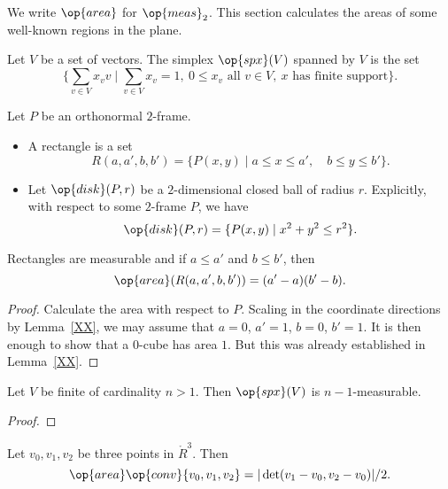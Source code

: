 We write $\op{area}$ for $\op{meas}_2$.  This section calculates the
areas of some well-known regions in the plane.

\begin{definition}  Let $V$ be a set of vectors.  The simplex
$\op{spx}(V)$ spanned by $V$ is the set
    $$\{ \sum_{v\in V} x_v v \mid \sum_{v\in V} x_v = 1,\ 0\le x_v \text{ all } v\in V,
    \ x \text{ has finite support}\}.$$
\end{definition}

\begin{definition}  Let $P$ be an orthonormal $2$-frame.
    \begin{itemize}
    \item A rectangle is a set
    $$R(a,a',b,b') = \{ P(x,y) \mid a \le x \le a',\quad b\le y\le b'\}.$$
    \item Let $\op{disk}(P,r)$
be a $2$-dimensional closed ball of radius $r$.  Explicitly, with
respect to some $2$-frame $P$, we have
    $$
    \op{disk}(P,r) = \{P(x,y) \mid x^2 + y^2 \le r^2\}.
    $$
    \end{itemize}
\end{definition}

\begin{lemma}
Rectangles are measurable and if $a\le a'$ and $b\le b'$, then
    $$\op{area}(R(a,a',b,b')) = (a'-a)(b'-b).$$
\end{lemma}

\begin{proof} Calculate the area with respect to $P$.  Scaling in
the coordinate directions by Lemma~\ref{XX}, we may assume that
$a=0$, $a'=1$, $b=0$, $b'=1$.  It is then enough to show that a
$0$-cube has area $1$.  But this was already established in
Lemma~\ref{XX}.
\end{proof}



\begin{lemma} Let $V$ be finite of cardinality $n>1$.  Then $\op{spx}(V)$ is
$n-1$-measurable.
\end{lemma}

\begin{proof}
\end{proof}

\begin{lemma} Let $v_0,v_1,v_2$ be three points in $\ring{R}^3$.
Then 
    $$
    \op{area}\op{conv}\{v_0,v_1,v_2\} = 
    |\det(v_1-v_0,v_2-v_0)|/2.
    $$
\end{lemma}



